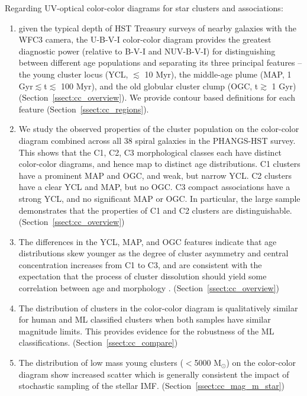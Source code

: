 \documentclass[linenumbers]{aastex63}
\begin{document}
Regarding UV-optical color-color diagrams for star clusters and associations:
\begin{enumerate}  
\item given the typical depth of HST Treasury surveys of nearby galaxies {with the WFC3 camera}, the U-B-V-I color-color diagram provides the greatest diagnostic power (relative to B-V-I and NUV-B-V-I) for distinguishing between different age populations and separating its three principal features --  the young cluster locus (YCL, $\lesssim$ 10 Myr), the middle-age plume (MAP, 1 Gyr$\lesssim$t$\lesssim$ 100 Myr), and the old globular cluster clump (OGC, t$\gtrsim$ 1 Gyr) {(Section~\ref{ssect:cc_overview})}.  We provide contour based definitions for each feature {(Section~\ref{ssect:cc_regions})}.
\item {We study the observed properties of the cluster population on the color-color diagram combined across all 38 spiral galaxies in the PHANGS-HST survey.  This shows that the} C1, C2, C3 morphological classes each have distinct color-color diagrams, and hence map to distinct age distributions.  C1 clusters have a prominent MAP and OGC, and weak, but narrow YCL.  C2 clusters have a clear YCL and MAP, but no OGC.  C3 compact associations have a strong YCL, and no significant MAP or OGC. {In particular, the large sample demonstrates that the properties of C1 and C2 clusters are distinguishable. (Section~\ref{ssect:cc_overview})}  
\item {The differences in the YCL, MAP, and OGC features indicate that age distributions skew younger as the degree of cluster asymmetry and central concentration increases from C1 to C3, and are consistent with the expectation that the process of cluster dissolution should yield some correlation between age and morphology \citep[e.g.,][and references therein]{adamo_legacy_2017, whitmore_star_2021, cook23}}. {(Section~\ref{ssect:cc_overview})}
\item  The distribution of clusters in the color-color diagram is qualitatively similar for human and ML classified clusters when both samples have similar magnitude limits.  This provides evidence for the robustness of the ML classifications.  {(Section~\ref{ssect:cc_compare})}
\item The distribution of low mass young clusters ($<$5000 M$_\odot$) on the color-color diagram show increased scatter which is generally consistent the impact of stochastic sampling of the stellar IMF.  {(Section~\ref{ssect:cc_mag_m_star})}
\end{enumerate}
\end{document}
